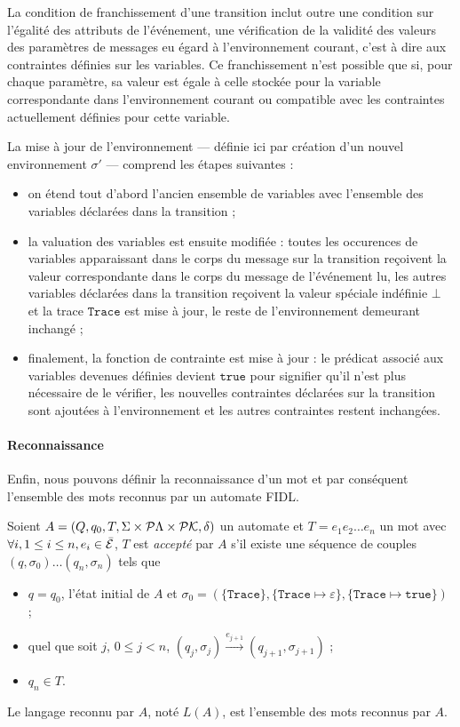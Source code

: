 La condition de franchissement d'une transition inclut outre une
condition sur l'\'egalit\'e des attributs de l'\'ev\'enement, une
v\'erification de la validit\'e des valeurs des param\`etres de
messages eu \'egard \`a l'environnement courant, c'est \`a dire aux
contraintes d\'efinies sur les variables. Ce franchissement n'est
possible que si, pour chaque param\`etre, sa valeur est \'egale \`a
celle stock\'ee pour la variable correspondante dans l'environnement
courant ou compatible avec les contraintes actuellement d\'efinies
pour cette variable.

La mise \`a jour de l'environnement --- d\'efinie ici par
cr\'eation d'un nouvel environnement $\sigma'$ --- comprend les
\'etapes suivantes :
\begin{itemize}
  \item on \'etend tout d'abord l'ancien ensemble de variables avec
  l'ensemble des variables d\'eclar\'ees dans la transition ;
\item la valuation des variables est ensuite modifi\'ee : toutes les
  occurences de variables apparaissant dans le corps du message sur la
  transition re\c{c}oivent la valeur correspondante dans le corps du
  message de l'\'ev\'enement lu, les autres variables
  d\'eclar\'ees dans la transition re\c{c}oivent la valeur
  sp\'eciale ind\'efinie $\bot$ et la trace $\mathtt{Trace}$ est
  mise \`a jour, le reste de l'environnement demeurant inchang\'e ;
\item finalement, la fonction de contrainte est mise \`a jour : le
  pr\'edicat associ\'e aux variables devenues d\'efinies devient
  $\mathtt{true}$ pour signifier qu'il n'est plus n\'ecessaire de le
  v\'erifier, les nouvelles contraintes d\'eclar\'ees sur la
  transition sont ajout\'ees \`a l'environnement et les autres contraintes restent inchang\'ees.
\end{itemize}

\paragraph{Reconnaissance}
Enfin, nous pouvons d\'efinir la reconnaissance d'un mot et par
cons\'equent l'ensemble des mots reconnus par un automate \textsf{FIDL}.
\begin{definition}
Soient $A= (Q,q_0,T,\Sigma \times{}{\cal P}\Lambda \times{}{\cal P}\mathcal{K},\delta)$ un
automate et $T=e_1 e_2 \dots e_n$ un mot avec $\forall i, 1\leq i \leq
n, e_i\in \bar{\cal E}$,
$T$ est
\emph{accept\'e} par $A$ s'il existe une s\'equence de couples
$(q,\sigma_0) \dots (q_{n},\sigma_{n})$ tels que
\begin{itemize}
  \item $q = q_0$, l'\'etat initial de $A$ et $\sigma_0 =
  (\{\mathtt{Trace}\},\{ \mathtt{Trace}\mapsto
  \varepsilon\},\{\mathtt{Trace}\mapsto \mathtt{true}\})$ ;
\item quel que soit $j$, $0\leq j < n$, $(q_j,\sigma_j)
  \xrightarrow{e_{j+1}} (q_{j+1},\sigma_{j+1})$ ;
\item $q_n \in T$.
\end{itemize}
Le langage reconnu par $A$, not\'e $L({A})$, est l'ensemble des
mots reconnus par $A$.
\end{definition}

